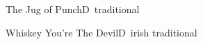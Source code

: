 \begin{song}{The Jug of Punch}{D}{~}{traditional}{}{}
	
\end{song}

\begin{song}{Whiskey You're The Devil}{D}{~}{irish traditional}{}{}
	
\end{song}